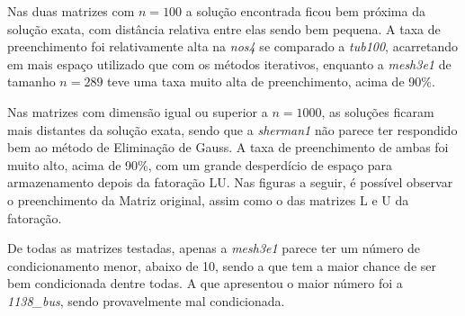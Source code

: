 \documentclass{article}
\begin{document}
Nas duas matrizes com $n=100$ a solução encontrada ficou bem próxima da solução exata, com distância relativa entre elas sendo bem pequena. A taxa de preenchimento foi relativamente alta na \textit{nos4} se comparado a \textit{tub100}, acarretando em mais espaço utilizado que com os métodos iterativos, enquanto a \textit{mesh3e1} de tamanho $n=289$ teve uma taxa muito alta de preenchimento, acima de 90\%.

Nas matrizes com dimensão igual ou superior a $n=1000$, as soluções ficaram mais distantes da solução exata, sendo que a \textit{sherman1} não parece ter respondido bem ao método de Eliminação de Gauss. A taxa de preenchimento de ambas foi muito alto, acima de 90\%, com um grande desperdício de espaço para armazenamento depois da fatoração LU. Nas figuras a seguir, é possível observar o preenchimento da Matriz original, assim como o das matrizes L e U da fatoração.

De todas as matrizes testadas, apenas a \textit{mesh3e1} parece ter um número de condicionamento menor, abaixo de 10, sendo a que tem a maior chance de ser bem condicionada dentre todas. A que apresentou o maior número foi a \textit{1138\_bus}, sendo provavelmente mal condicionada.
\end{document}
